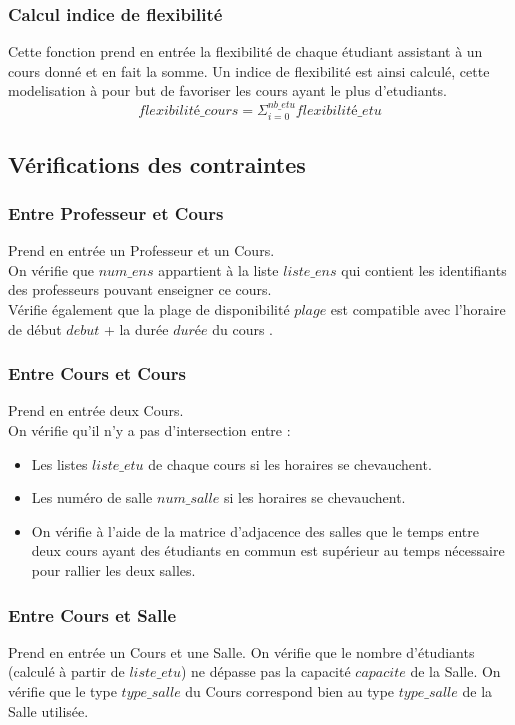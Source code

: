 \documentclass[a4paper,11pt]{article}
\begin{document}
		\subsubsection{Calcul indice de flexibilité}
			Cette fonction prend en entrée la flexibilité de chaque étudiant assistant à un cours donné et en fait la somme. Un indice de flexibilité est ainsi calculé, cette modelisation à pour but de favoriser les cours ayant le plus d'etudiants.\\
			$$flexibilité\_cours = \Sigma_{i = 0}^{nb\_etu} flexibilité\_etu$$
	\subsection{Vérifications des contraintes}
		\subsubsection{Entre Professeur et Cours}
			Prend en entrée un Professeur et un Cours.\\
			On vérifie que $num\_ens$ appartient à la liste $liste\_ens$ qui contient les identifiants des professeurs pouvant enseigner ce cours.\\
			Vérifie également que la plage de disponibilité $plage$ est compatible avec l'horaire de début $debut$ + la durée $durée$ du cours .
		\subsubsection{Entre Cours et Cours}
			Prend en entrée deux Cours.\\
			On vérifie qu'il n'y a pas d'intersection entre :\\
			\begin{itemize}
				\item Les listes $liste\_etu$ de chaque cours si les horaires se chevauchent.
				\item Les numéro de salle $num\_salle$ si les horaires se chevauchent.
				\item On vérifie à l'aide de la matrice d'adjacence des salles que le temps entre deux cours ayant des étudiants en commun est supérieur au temps nécessaire pour rallier les deux salles.
			\end{itemize}
		\subsubsection{Entre Cours et Salle}
			Prend en entrée un Cours et une Salle.
			On vérifie que le nombre d'étudiants (calculé à partir de $liste\_etu$) ne dépasse pas la capacité $capacite$ de la Salle.
			On vérifie que le type $type\_salle$ du Cours correspond bien au type $type\_salle$ de la Salle utilisée.
\end{document}
